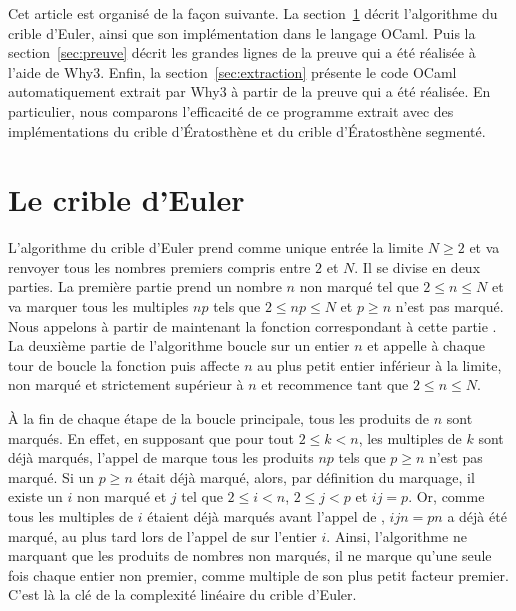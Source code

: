 \documentclass[a4paper]{easychair}
\begin{document}
Cet article est organisé de la façon suivante.
La section~\ref{sec:algo} décrit l'algorithme du crible d'Euler, ainsi que son
implémentation dans le langage OCaml.
Puis la section~\ref{sec:preuve} décrit les grandes lignes de la preuve qui a
été réalisée à l'aide de Why3.
Enfin, la section~\ref{sec:extraction} présente le code OCaml
automatiquement extrait par Why3 à partir
de la preuve qui a été réalisée. En particulier, nous comparons l'efficacité
de ce programme extrait avec des implémentations du crible d'Ératosthène et
du crible d'Ératosthène segmenté.

\section{Le crible d'Euler}
\label{sec:algo}

L'algorithme du crible d'Euler prend comme unique entrée la limite $N \geq 2$
et va renvoyer tous les nombres premiers compris entre $2$ et $N$.
Il se divise en deux parties.
La première partie prend un nombre $n$ non marqué
tel que $2 \leq n \leq N$ et va marquer tous les multiples $np$ tels que
$2 \leq np \leq N$ et $p \geq n$ n'est pas marqué.
Nous appelons à partir de maintenant la fonction correspondant à
cette partie .
La deuxième partie de l'algorithme boucle sur un entier $n$ et appelle
à chaque tour de boucle la fonction  puis
affecte $n$ au plus petit entier inférieur à la limite,
non marqué et strictement supérieur à $n$
et recommence tant que $2 \leq n \leq N$.

À la fin de chaque étape de la boucle principale, tous les produits de $n$
sont marqués. En effet, en supposant que pour tout $2 \leq k < n$,
les multiples de $k$ sont déjà marqués, l'appel de 
marque tous les produits $np$ tels que $p \geq n$ n'est pas marqué.
Si un $p \geq n$ était déjà marqué,
alors, par définition du marquage, il existe un $i$ non marqué et $j$ tel que
$2 \leq i < n$, $2 \leq j < p$ et $ij = p$.
Or, comme tous les multiples de $i$
étaient déjà marqués avant l'appel de , $ijn = pn$
a déjà été marqué, au plus tard lors de l'appel de 
sur l'entier $i$.
Ainsi, l'algorithme ne marquant que les produits de nombres non marqués, il ne
marque qu'une seule fois chaque entier non premier, comme multiple de
son plus petit facteur premier. C'est là la clé de la complexité
linéaire du crible d'Euler.
\end{document}

